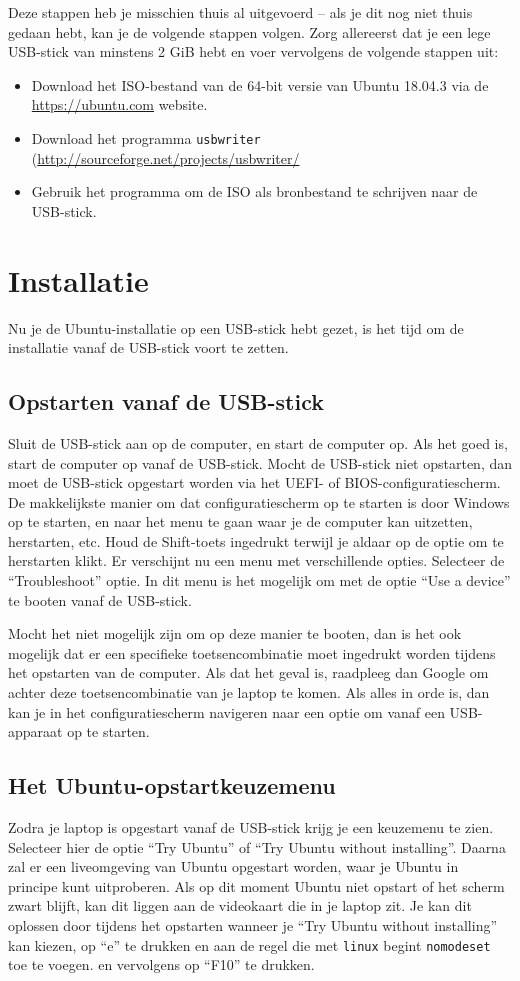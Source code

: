 \documentclass[10pt,a4paper]{article}
\begin{document}
Deze stappen heb je misschien thuis al uitgevoerd -- als je dit nog niet thuis gedaan hebt, kan je de volgende stappen volgen.
Zorg allereerst dat je een lege USB-stick van minstens 2 GiB hebt en
voer vervolgens de volgende stappen uit:
\begin{itemize}
\item Download het ISO-bestand van de 64-bit versie van Ubuntu 18.04.3 via de \url{https://ubuntu.com} website.
\item Download het programma \verb|usbwriter| (\url{http://sourceforge.net/projects/usbwriter/}
\item Gebruik het programma om de ISO als bronbestand te schrijven naar de USB-stick.
\end{itemize}


\section{Installatie}

Nu je de Ubuntu-installatie op een USB-stick hebt gezet,
is het tijd om de installatie vanaf de USB-stick voort te zetten.

\subsection{Opstarten vanaf de USB-stick}
Sluit de USB-stick aan op de computer, en start de computer op.
Als het goed is, start de computer op vanaf de USB-stick.
Mocht de USB-stick niet opstarten, dan moet de USB-stick opgestart
worden via het UEFI- of BIOS-configuratiescherm.
De makkelijkste manier om dat configuratiescherm op te starten is door
Windows op te starten, en naar het menu te gaan waar je de computer kan uitzetten, herstarten, etc.
Houd de Shift-toets ingedrukt terwijl je aldaar op de optie om te herstarten klikt.
Er verschijnt nu een menu met verschillende opties. Selecteer de ``Troubleshoot'' optie.
In dit menu is het mogelijk om met de optie ``Use a device'' te booten vanaf de USB-stick.

Mocht het niet mogelijk zijn om op deze manier te booten, dan is het ook mogelijk dat er een
specifieke toetsencombinatie moet ingedrukt worden tijdens het opstarten van de computer.
Als dat het geval is, raadpleeg dan Google om achter deze toetsencombinatie van je laptop te komen.
Als alles in orde is, dan kan je in het configuratiescherm navigeren naar een optie
om vanaf een USB-apparaat op te starten.
\subsection{Het Ubuntu-opstartkeuzemenu}
Zodra je laptop is opgestart vanaf de USB-stick krijg je een keuzemenu te zien.
Selecteer hier de optie ``Try Ubuntu'' of ``Try Ubuntu without installing''.
Daarna zal er een liveomgeving van Ubuntu opgestart worden,
waar je Ubuntu in principe kunt uitproberen. Als op dit moment Ubuntu niet opstart of het scherm
zwart blijft, kan dit liggen aan de videokaart die in je laptop zit. Je kan dit oplossen door tijdens
het opstarten wanneer je ``Try Ubuntu without installing'' kan kiezen, op ``e'' te drukken en
aan de regel die met \texttt{linux} begint \texttt{nomodeset} toe te voegen. en vervolgens op ``F10'' te
drukken.
\end{document}
